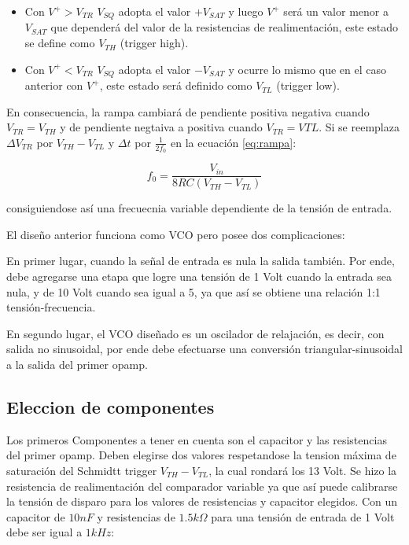 \begin{itemize}
	\item Con $V^{+} > V_{TR}$ $V_{SQ}$ adopta el valor $+V_{SAT}$ y luego $V^{+}$ será un valor menor a $V_{SAT}$ que dependerá del valor de la resistencias de realimentación, este estado se define como $V_{TH}$ (trigger high).
	\item Con  $V^{+} < V_{TR}$ $V_{SQ}$ adopta el valor $-V_{SAT}$ y ocurre lo mismo que en el caso anterior con $V^{+}$, este estado será definido como $V_{TL}$ (trigger low).
\end{itemize}


En consecuencia, la rampa cambiará de pendiente positiva  negativa cuando $V_{TR} = V_{TH}$ y de pendiente negtaiva a positiva cuando $V_{TR} = V{TL}$. Si se reemplaza $\Delta V_{TR}$ por $V_{TH} - V_{TL}$ y $\Delta t $ por $\frac{1}{2f_0}$ en la ecuación \ref{eq:rampa}:

\begin{equation}\label{eq:frecuencia}
f_0 = \frac{V_{in}}{8RC(V_{TH} - V_{TL})}
\end{equation}

consiguiendose así una frecuecnia variable dependiente de la tensión de entrada. \newline

El diseño anterior funciona como VCO pero posee dos complicaciones: \newline

En primer lugar, cuando la señal de entrada es nula la salida también. Por ende, debe agregarse una etapa que logre una tensión de 1 Volt cuando la entrada sea nula, y de 10 Volt cuando sea igual a 5, ya que así se obtiene una relación 1:1 tensión-frecuencia. \newline

En segundo lugar, el VCO diseñado es un oscilador de relajación, es decir, con salida no sinusoidal, por ende debe efectuarse una conversión triangular-sinusoidal a la salida del primer opamp. 

\subsection{Eleccion de componentes}

Los primeros Componentes a tener en cuenta son el capacitor y las resistencias del primer opamp. Deben elegirse dos valores respetandose la tension máxima de saturación del Schmidtt trigger $V_{TH} - V_{TL}$, la cual rondará los 13 Volt. Se hizo la resistencia de realimentación del comparador variable ya que así puede calibrarse la tensión de disparo para los valores de resistencias y capacitor elegidos. Con un capacitor de $10nF$ y resistencias de $1.5k\Omega$ para una tensión de entrada de 1 Volt debe ser igual a $1kHz$:

